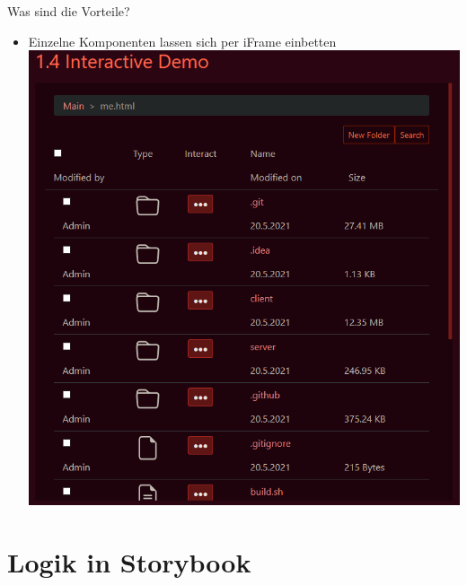 \documentclass{beamer}
\begin{document}
\begin{frame}{Was sind die Vorteile?}
	\begin{itemize}
		\item Einzelne Komponenten lassen sich per iFrame einbetten
		\includegraphics[scale=.5]{Images/interactive_demo.png}
	\end{itemize}
\end{frame}

\section{Logik in Storybook} %
\end{document}
